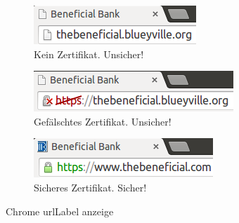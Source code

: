 \begin{figure}[htb]
  \begin{subfigure}[b]{.30\linewidth}
    \centering
    \includegraphics[width=0.9\linewidth]{images/https-chrome-none.png}
    \caption{Kein Zertifikat. Unsicher!}
    \label{fig:phishing:angriffvorbereiten:angriffsvektoren:fakecertificates:chrome:none}
  \end{subfigure}%
    \begin{subfigure}[b]{.30\linewidth}
      \centering
      \includegraphics[width=0.9\linewidth]{images/https-chrome-fake.png}
      \caption{Gefälschtes Zertifikat. Unsicher!}
      \label{fig:phishing:angriffvorbereiten:angriffsvektoren:fakecertificates:chrome:fake}
    \end{subfigure}
	\begin{subfigure}[b]{.30\linewidth}
		\centering
		\includegraphics[width=0.9\linewidth]{images/https-chrome-secure.png}
		\caption{Sicheres Zertifikat. Sicher!}
		\label{fig:phishing:angriffvorbereiten:angriffsvektoren:fakecertificates:chrome:secure}
	\end{subfigure}
  \caption{Chrome \Gls{urlLabel} anzeige}
  \label{fig:phishing:angriffvorbereiten:angriffsvektoren:fakecertificates:chrome}
\end{figure}

